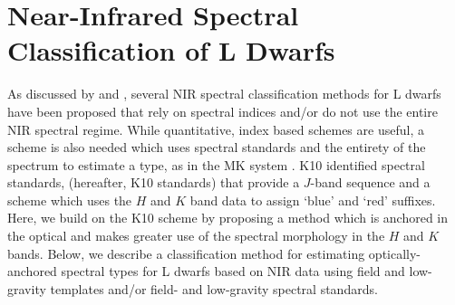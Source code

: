 \documentclass[12pt,preprint]{aastex}
\begin{document}


\clearpage
\section{Near-Infrared Spectral Classification of L Dwarfs}
\label{sec:classification}

As discussed by \citet[\S~3.2]{Kirkpatrick05} and \citet[hereafter K10]{Kirkpatrick10}, several NIR spectral classification methods for L dwarfs have been proposed that rely on spectral indices and/or do not use the entire NIR spectral regime.
While quantitative, index based schemes are useful, a scheme is also needed which uses spectral standards and the entirety of the spectrum to estimate a type, as in the MK system \citep{Morgan:1984wy}.
K10 identified spectral standards, (hereafter, K10 standards) that provide a $J$-band sequence and a scheme which uses the $H$ and $K$ band data to assign `blue' and `red' suffixes. 
Here, we build on the K10 scheme by proposing a method which is anchored in the optical and makes greater use of the spectral morphology in the $H$ and $K$ bands.
Below, we describe a classification method for estimating optically-anchored spectral types for L dwarfs based on NIR data using field and low-gravity templates and/or field- and low-gravity spectral standards.
\end{document}
